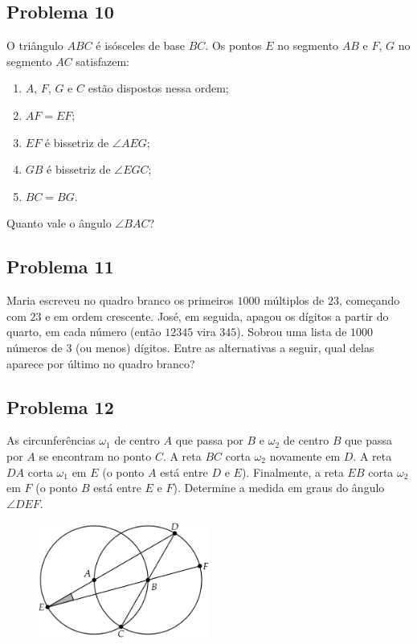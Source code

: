 \documentclass[12pt]{article}
\begin{document}
\clearpage

\subsection{Problema 10}
\begin{tcolorbox}[statementbox]
O triângulo $ABC$ é isósceles de base $BC$. Os pontos $E$ no segmento $AB$ e $F$, $G$ no segmento $AC$ satisfazem:
\begin{enumerate}[label={\roman*.}]
  \item $A$, $F$, $G$ e $C$ estão dispostos nessa ordem;
  \item $AF = EF$;
  \item $EF$ é bissetriz de $\angle AEG$;
  \item $GB$ é bissetriz de $\angle EGC$;
  \item $BC = BG$.
\end{enumerate}
Quanto vale o ângulo $\angle BAC$?
\end{tcolorbox}

\clearpage

\subsection{Problema 11}
\begin{tcolorbox}[statementbox]
Maria escreveu no quadro branco os primeiros $1000$ múltiplos de $23$, começando com $23$ e em ordem
crescente. José, em seguida, apagou os dígitos a partir do quarto, em cada número (então $12345$ vira $345$).
Sobrou uma lista de $1000$ números de $3$ (ou menos) dígitos.
Entre as alternativas a seguir, qual delas aparece por último no quadro branco?

\end{tcolorbox}

\clearpage

\subsection{Problema 12}
\begin{tcolorbox}[statementbox]
As circunferências $\omega_1$ de centro $A$ que passa por $B$ e $\omega_2$ de centro $B$ que passa por $A$ se encontram no ponto
$C$. A reta $BC$ corta $\omega_2$ novamente em $D$. A reta $DA$ corta $\omega_1$ em $E$ (o ponto $A$ está entre $D$ e $E$). Finalmente, a
reta $EB$ corta $\omega_2$ em $F$ (o ponto $B$ está entre $E$ e $F$). Determine a medida em graus do ângulo $\angle DEF$.
          \begin{figure}[h]
            \centering
            \includegraphics[width=0.5\textwidth]{fourth.png}
          \end{figure}
\end{tcolorbox}
\end{document}
